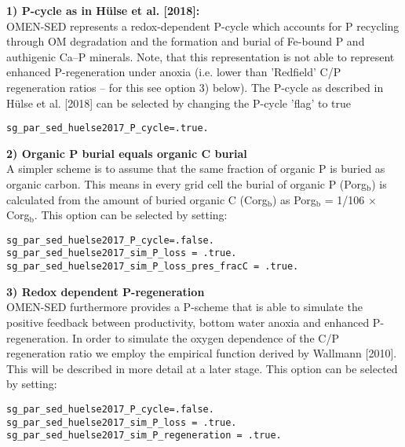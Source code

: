 \vspace{1mm}
\noindent
\textbf{1) P-cycle as in H\"ulse et al. [2018]:}\\
OMEN-SED represents a redox-dependent P-cycle which accounts for P recycling through OM degradation and the formation and burial of Fe-bound P and authigenic Ca--P minerals. Note, that this representation is not able to represent enhanced P-regeneration under anoxia (i.e. lower than 'Redfield' C/P regeneration ratios -- for this see option 3) below). The P-cycle as described in H\"ulse et al. [2018] can be selected by changing the P-cycle 'flag' to true
\vspace{-1mm}\begin{verbatim}
sg_par_sed_huelse2017_P_cycle=.true.
\end{verbatim}\vspace{-1mm}

\vspace{1mm}
\noindent
\textbf{2) Organic P burial equals organic C burial}\\
A simpler scheme is to assume that the same fraction of organic P is buried as organic carbon. This means in every grid cell the burial of organic P (Porg$_\mathrm{b}$) is calculated from the amount of buried organic C (Corg$_\mathrm{b}$) as
Porg$_\mathrm{b}$ = 1/106 $\times$ Corg$_\mathrm{b}$. This option can be selected by setting:
\vspace{-1mm}\begin{verbatim}
sg_par_sed_huelse2017_P_cycle=.false.
sg_par_sed_huelse2017_sim_P_loss = .true.
sg_par_sed_huelse2017_sim_P_loss_pres_fracC = .true.
\end{verbatim}\vspace{-1mm}

\vspace{1mm}
\noindent
\textbf{3) Redox dependent P-regeneration}\\
OMEN-SED furthermore provides a P-scheme that is able to simulate the positive feedback between productivity, bottom water anoxia and enhanced P-regeneration. In order to simulate the oxygen dependence of the C/P regeneration ratio we employ the
empirical function derived by Wallmann [2010]. This will be described in more detail at a later stage. This option can be selected by setting:
\vspace{-2mm}\begin{verbatim}
sg_par_sed_huelse2017_P_cycle=.false.
sg_par_sed_huelse2017_sim_P_loss = .true.
sg_par_sed_huelse2017_sim_P_regeneration = .true.
\end{verbatim}\vspace{-2mm}

